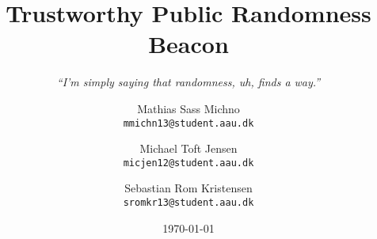 \newcommand{\TITLE}{Trustworthy Public Randomness Beacon}
\newcommand{\SUBTITLE}{\textit{\enquote{I'm simply saying that randomness, uh, finds a way.}}}
\newcommand{\GROUP}{deis1014f18}
\newcommand{\PERIOD}{Spring semester, 2018}
\newcommand{\MEMBERS}{%
    Mathias Sass Michno\\
    Michael Toft Jensen\\
    Sebastian Rom Kristensen
}
\newcommand{\SUPERVISOR}{René Rydhof Hansen\\Stefan Schmid}
\newcommand{\COMPLETION}{June 8, 2018}

\title{\TITLE}
\subtitle{\SUBTITLE}
\author{
    Mathias Sass Michno\\
    \texttt{mmichn13@student.aau.dk}
    \and
    Michael Toft Jensen\\
    \texttt{micjen12@student.aau.dk}
    \and
    Sebastian Rom Kristensen\\
    \texttt{sromkr13@student.aau.dk}
}
\date{\today}
